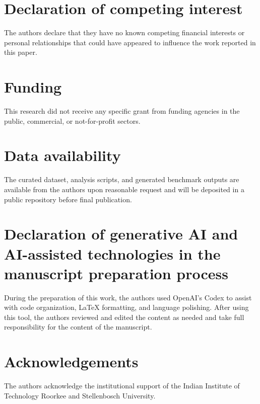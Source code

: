 \documentclass[review,12pt,number]{elsarticle}
\begin{document}
\section*{Declaration of competing interest}

The authors declare that they have no known competing financial interests or personal relationships that could have appeared to influence the work reported in this paper.

\section*{Funding}

This research did not receive any specific grant from funding agencies in the public, commercial, or not-for-profit sectors.

\section*{Data availability}

The curated dataset, analysis scripts, and generated benchmark outputs are available from the authors upon reasonable request and will be deposited in a public repository before final publication.

\section*{Declaration of generative AI and AI-assisted technologies in the manuscript preparation process}

During the preparation of this work, the authors used OpenAI's Codex to assist with code organization, LaTeX formatting, and language polishing. After using this tool, the authors reviewed and edited the content as needed and take full responsibility for the content of the manuscript.

\section*{Acknowledgements}

The authors acknowledge the institutional support of the Indian Institute of Technology Roorkee and Stellenbosch University.
\end{document}
